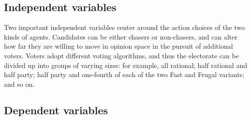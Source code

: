 \subsection{Independent variables}


Two important independent variables center around the action choices of the two
kinds of agents. Candidates can be either chasers or non-chasers, and can alter
how far they are willing to move in opinion space in the pursuit of additional
voters. Voters adopt different voting algorithms, and thus the electorate can
be divided up into groups of varying sizes: for example, all rational; half
rational and half party; half party and one-fourth of each of the two Fast and
Frugal variants; and so on.

%
%
%
%
%    


\subsection{Dependent variables}

